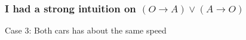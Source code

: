 \documentclass[slidestop,compress,mathserif]{beamer}
\newcommand{\ej}[2]{#1} %
\begin{document}
 \begin{frame}
  \ej{
  \frametitle{I had a strong intuition on $(O\rightarrow
  A)\lor (A\rightarrow O)$}
  }
  {
  \frametitle{ダメット公理$(O\rightarrow  A)\lor (A\rightarrow O)$の計算
  的解釈}
  }

  \ej
  { Case 3: Both cars has about the same speed}
  { 場合3: 両方だいたい揃って動く場合}

\end{frame}
\end{document}
